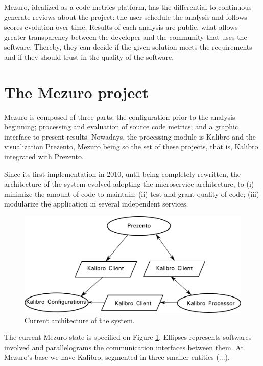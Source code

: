 \documentclass{llncs}
\begin{document}
Mezuro, idealized as a code metrics platform, has the differential to
continuous generate reviews about the project: the user schedule the
analysis and follows scores evolution over time. Results of each analysis
are public, what allows greater transparency between the developer and the
community that uses the software. Thereby, they can decide if the given solution
meets the requirements and if they should trust in the quality of the software.

\section{The Mezuro project}
\label{sec:mezuro}

Mezuro is composed of three parts: the configuration prior to the analysis beginning;
processing and evaluation of source code metrics; and a graphic interface to
present results. Nowadays, the processing module is Kalibro and the visualization
Prezento, Mezuro being so the set of these projects, that is, Kalibro integrated
with Prezento.

Since its first implementation in 2010\cite{mezuro2012}, until being completely
rewritten, the architecture of the system evolved adopting the microservice architecture\cite{namiot2014micro},
to (i) minimize the amount of code to maintain;
(ii) test and grant quality of code;
(iii) modularize the application in several independent services.

\begin{figure}[hbt]
  \centering
    \includegraphics[width=\textwidth]{images/mezuro-architecturev3.png}
  \caption{Current architecture of the system.}
  \label{fig:architecture-2}
\end{figure}


The current Mezuro state is specified on Figure \ref{fig:architecture-2}. Ellipses represents
softwares involved and parallelograms the communication interfaces between them. At Mezuro's
base we have Kalibro, segmented in three smaller entities (...).
\end{document}
